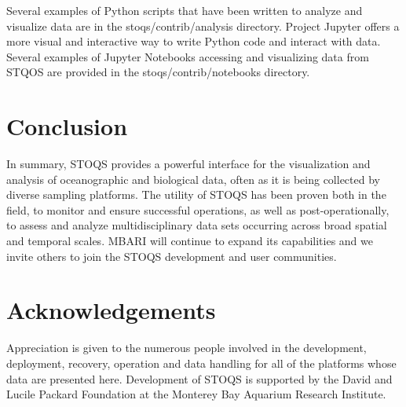 \documentclass[conference]{IEEEtran}
\begin{document}
Several examples of Python scripts that have been written to analyze and
visualize data are in the stoqs/contrib/analysis directory. Project Jupyter 
offers a more visual and interactive way to write Python code and interact
with data. Several examples of Jupyter Notebooks accessing and visualizing
data from STQOS are provided in the stoqs/contrib/notebooks directory.

\section{Conclusion}
In summary, STOQS provides a powerful interface for the visualization and 
analysis of oceanographic and biological data, often as it is being collected 
by diverse sampling platforms.  The utility of STOQS has been proven both in 
the field, to monitor and ensure successful operations, as well as 
post-operationally, to assess and analyze multidisciplinary data sets 
occurring across broad spatial and temporal scales. MBARI will continue to 
expand its capabilities and we invite others to join the STOQS development and user communities.




\section*{Acknowledgements}

Appreciation is given to the numerous people involved in the development, 
deployment, recovery, operation and data handling for all of the platforms 
whose data are presented here. Development of STOQS is supported by the 
David and Lucile Packard Foundation at the Monterey Bay Aquarium Research Institute.








%




\end{document}
